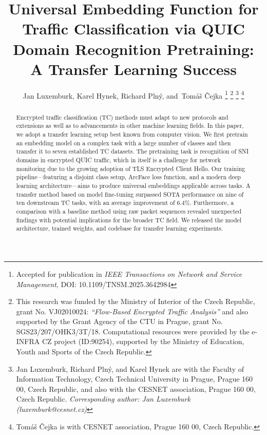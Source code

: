 \documentclass[lettersize,journal,twoside,article]{IEEEtran}
\begin{document}

\title{Universal Embedding Function for Traffic Classification via QUIC Domain Recognition Pretraining: A Transfer Learning Success}

\author{Jan Luxemburk,
        Karel Hynek,
        Richard Plný,
        and~Tomáš Čejka
\thanks{Accepted for publication in \textit{IEEE Transactions on Network and Service Management}, DOI: 10.1109/TNSM.2025.3642984}
\thanks{This research was funded by the Ministry of Interior of the Czech Republic, grant No. VJ02010024: \textit{``Flow-Based Encrypted Traffic Analysis''} and also supported by the Grant Agency of the CTU in Prague, grant No. SGS23/207/OHK3/3T/18. Computational resources were provided by the e-INFRA CZ project (ID:90254), supported by the Ministry of Education, Youth and Sports of the Czech Republic.}
\thanks{Jan Luxemburk, Richard Plný, and Karel Hynek are with the Faculty of Information Technology, Czech Technical University in Prague, Prague 160 00, Czech Republic, and also with the CESNET association, Prague 160 00, Czech Republic. \textit{Corresponding author: Jan Luxemburk (luxemburk@cesnet.cz)}}
\thanks{Tomáš Čejka is with CESNET association, Prague 160 00, Czech Republic.}
}


\maketitle


\begin{abstract}
Encrypted traffic classification (TC) methods must adapt to new protocols and extensions as well as to advancements in other machine learning fields. In this paper, we adopt a transfer learning setup best known from computer vision. We first pretrain an embedding model on a complex task with a large number of classes and then transfer it to seven established TC datasets. The pretraining task is recognition of SNI domains in encrypted QUIC traffic, which in itself is a challenge for network monitoring due to the growing adoption of TLS Encrypted Client Hello. Our training pipeline---featuring a disjoint class setup, ArcFace loss function, and a modern deep learning architecture---aims to produce universal embeddings applicable across tasks. A transfer method based on model fine-tuning surpassed SOTA performance on nine of ten downstream TC tasks, with an average improvement of 6.4\%. Furthermore, a comparison with a baseline method using raw packet sequences revealed unexpected findings with potential implications for the broader TC field. We released the model architecture, trained weights, and codebase for transfer learning experiments.

\end{abstract}
\end{document}
